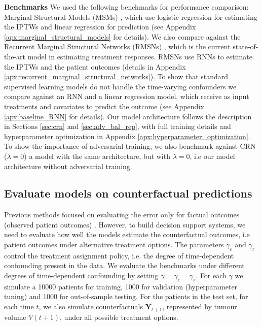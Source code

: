 \documentclass{article} %
\newcommand{\vc}[1]{\mathbf{#1}}
\begin{document}
	
    
    \textbf{Benchmarks} We used the following benchmarks for performance comparison: Marginal Structural Models (MSMs) \citep{robins2000marginal}, which use logistic regression for estimating the IPTWs and linear regression for prediction (see Appendix \ref{apx:marginal_structural_models} for  details). We also compare against the Recurrent Marginal Structural Networks (RMSNs) \cite{lim2018forecasting}, which is the current state-of-the-art model in estimating treatment responses. RMSNs use RNNs to estimate the IPTWs and the patient outcomes (details in Appendix \ref{apx:recurrent_marginal_structural_networks}). To show that standard supervised learning models do not handle the time-varying confounders we compare against an RNN and a linear regression model, which receive as input treatments and covariates to predict the outcome (see Appendix \ref{apx:baseline_RNN} for details). Our model architecture follows the description in Sections \ref{sec:crn} and \ref{sec:adv_bal_rep}, with full training details and hyperparameter optimization in Appendix \ref{apx:hyperparameter_optimization}. To show the importance of adversarial training, we also benchmark against CRN ($\lambda = 0$)  a model with the same architecture, but with $\lambda = 0$, i.e our model architecture without adversarial training. 


	\subsection{Evaluate models on counterfactual predictions}
	
	Previous methods focused on evaluating the error only for factual outcomes (observed patient outcomes) \citep{lim2018forecasting}. However, to build decision support systems, we need to evaluate how well the models estimate the counterfactual outcomes, i.e patient outcomes under alternative treatment options. 	The parameters $\gamma_c$ and $\gamma_r$ control the treatment assignment policy, i.e. the degree of time-dependent confounding present in the data. We evaluate the benchmarks under different degrees of time-dependent confounding by setting $\gamma = \gamma_c = \gamma_r$. For each $\gamma$ we simulate a 10000 patients for training, 1000 for validation (hyperparameter tuning) and 1000 for out-of-sample testing. For the patients in the test set, for each time $t$, we also simulate counterfactuals $\vc{Y}_{t+1}$, represented by tumour volume $V(t+1)$, under all possible treatment options. 
\end{document}
